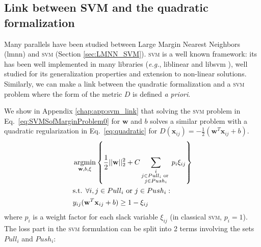 \subsection{Link between SVM and the quadratic formalization}

Many parallels have been studied between Large Margin Nearest Neighbors ({\sc lmnn}) and \textsc{svm} (Section \ref{sec:LMNN_SVM}). \textsc{svm} is a well known framework: its has been well implemented in many libraries (\textit{e.g.}, {\sc liblinear} \cite{Fan2008} and {\sc libsvm} \cite{Hsu2008}), well studied for its generalization properties and extension to non-linear solutions. Similarly, we can make a link between the quadratic formalization and a \textsc{svm} problem where the form of the metric $D$ is defined \textit{a priori}.

We show in Appendix \ref{chap:app:svm_link} that solving the \textsc{svm} problem in Eq.~\ref{eq:SVMSofMarginProblem0} for $\textbf{w}$ and $b$ solves a similar problem with a quadratic regularization in Eq.~\ref{eq:quadratic} for $D(\textbf{x}_{ij})=-\frac{1}{2}(\textbf{w}^T\textbf{x}_{ij}+b)$. 
\begin{equation}
\begin{aligned}
&\displaystyle \argmin_{\textbf{w},b,\xi} 
\left\lbrace \frac{1}{2}||\textbf{w}||_2^2
+ C \sum\limits_{\substack{i \\j \in Pull_i \text{  or  } \\ j \in Push_i}}p_i\xi_{ij} \right\rbrace \\
& \text{s.t.  }  \forall i,j \in Pull_i \text{  or  } j \in Push_i: \\
& y_{ij}(\textbf{w}^T\textbf{x}_{ij}+b) \geq 1-\xi_{ij}
\end{aligned}
\label{eq:SVMSofMarginProblem0}
\end{equation}
\noindent where $p_i$ is a weight factor for each slack variable $\xi_{ij}$ (in classical \textsc{svm}, $p_i=1$). The loss part in the \textsc{svm} formulation can be split into 2 terms involving the sets $Pull_i$ and $Push_i$:

